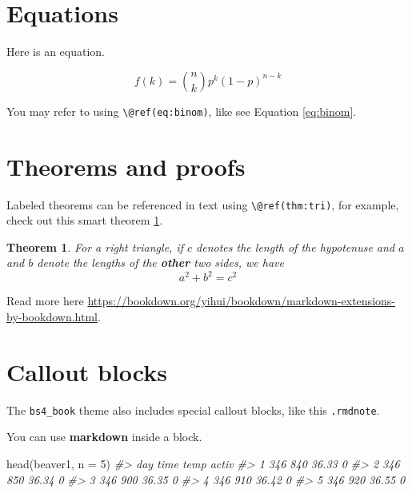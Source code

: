 \documentclass[
]{book}
\newenvironment{Shaded}{\begin{snugshade}}{\end{snugshade}}
\newcommand{\AttributeTok}[1]{\textcolor[rgb]{0.77,0.63,0.00}{#1}}
\newcommand{\CommentTok}[1]{\textcolor[rgb]{0.56,0.35,0.01}{\textit{#1}}}
\newcommand{\DecValTok}[1]{\textcolor[rgb]{0.00,0.00,0.81}{#1}}
\newcommand{\FunctionTok}[1]{\textcolor[rgb]{0.00,0.00,0.00}{#1}}
\newcommand{\NormalTok}[1]{#1}
\newtheorem{theorem}{Theorem}[chapter]
\theoremstyle{definition}
\theoremstyle{definition}
\theoremstyle{definition}
\theoremstyle{definition}
\theoremstyle{remark}
\begin{document}
\hypertarget{equations}{%
\section{Equations}\label{equations}}

Here is an equation.

\begin{equation} 
  f\left(k\right) = \binom{n}{k} p^k\left(1-p\right)^{n-k}
  \label{eq:binom}
\end{equation}

You may refer to using \texttt{\textbackslash{}@ref(eq:binom)}, like see Equation \eqref{eq:binom}.

\hypertarget{theorems-and-proofs}{%
\section{Theorems and proofs}\label{theorems-and-proofs}}

Labeled theorems can be referenced in text using \texttt{\textbackslash{}@ref(thm:tri)}, for example, check out this smart theorem \ref{thm:tri}.

\begin{theorem}
\protect\hypertarget{thm:tri}{}\label{thm:tri}For a right triangle, if \(c\) denotes the \emph{length} of the hypotenuse
and \(a\) and \(b\) denote the lengths of the \textbf{other} two sides, we have
\[a^2 + b^2 = c^2\]
\end{theorem}

Read more here \url{https://bookdown.org/yihui/bookdown/markdown-extensions-by-bookdown.html}.

\hypertarget{callout-blocks}{%
\section{Callout blocks}\label{callout-blocks}}

The \texttt{bs4\_book} theme also includes special callout blocks, like this \texttt{.rmdnote}.

You can use \textbf{markdown} inside a block.

\begin{Shaded}
\begin{Highlighting}[]
\FunctionTok{head}\NormalTok{(beaver1, }\AttributeTok{n =} \DecValTok{5}\NormalTok{)}
\CommentTok{\#\textgreater{}   day time  temp activ}
\CommentTok{\#\textgreater{} 1 346  840 36.33     0}
\CommentTok{\#\textgreater{} 2 346  850 36.34     0}
\CommentTok{\#\textgreater{} 3 346  900 36.35     0}
\CommentTok{\#\textgreater{} 4 346  910 36.42     0}
\CommentTok{\#\textgreater{} 5 346  920 36.55     0}
\end{Highlighting}
\end{Shaded}
\end{document}
